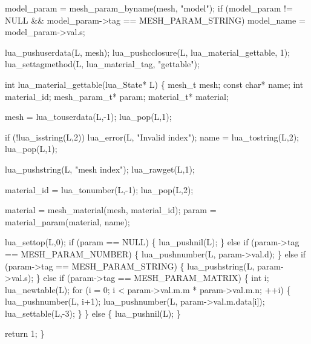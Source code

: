 \nwenddocs{}\endmoddef
model_param = mesh_param_byname(mesh, "model");
if (model_param != NULL && model_param->tag == MESH_PARAM_STRING)
    model_name = model_param->val.s;
\nwendcode{}\nwdocspar


\nwenddocs{}\plusendmoddef
lua_pushuserdata(L, mesh);
lua_pushcclosure(L, lua_material_gettable, 1);
lua_settagmethod(L, lua_material_tag, "gettable");
\nwendcode{}\nwdocspar

\nwenddocs{}\plusendmoddef
int lua_material_gettable(lua_State* L)
\{
    mesh_t mesh;
    const char* name;
    int material_id;
    mesh_param_t* param;
    material_t* material;

    mesh = lua_touserdata(L,-1);
    lua_pop(L,1);

    if (!lua_isstring(L,2))
        lua_error(L, "Invalid index");
    name = lua_tostring(L,2);
    lua_pop(L,1);

    lua_pushstring(L, "mesh index");
    lua_rawget(L,1);

    material_id = lua_tonumber(L,-1);
    lua_pop(L,2);

    material = mesh_material(mesh, material_id);
    param = material_param(material, name);

    lua_settop(L,0);
    if (param == NULL) \{
        lua_pushnil(L);
    \} else if (param->tag == MESH_PARAM_NUMBER) \{
        lua_pushnumber(L, param->val.d);
    \} else if (param->tag == MESH_PARAM_STRING) \{
        lua_pushstring(L, param->val.s);
    \} else if (param->tag == MESH_PARAM_MATRIX) \{
        int i;
        lua_newtable(L);
        for (i = 0; i < param->val.m.m * param->val.m.n; ++i) \{
            lua_pushnumber(L, i+1);
            lua_pushnumber(L, param->val.m.data[i]);
            lua_settable(L,-3);
        \}
    \} else \{
        lua_pushnil(L);
    \}

    return 1;
\}

\nwendcode{}\nwdocspar


